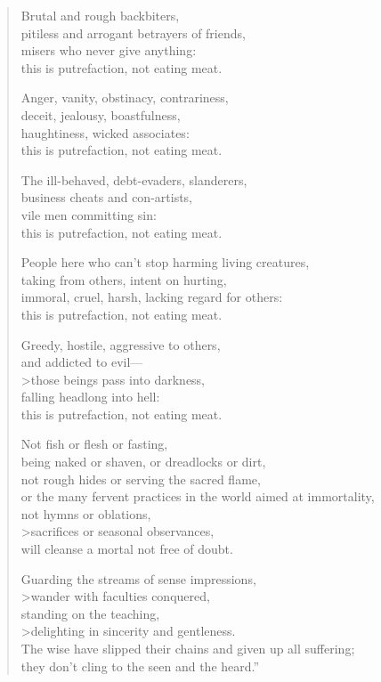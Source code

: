 \documentclass[12pt,openany]{book}%
\begin{document}
\begin{verse}
Brutal and rough backbiters, \\
pitiless and arrogant betrayers of friends, \\
misers who never give anything: \\
this is putrefaction, not eating meat. 

Anger, vanity, obstinacy, contrariness, \\
deceit, jealousy, boastfulness, \\
haughtiness, wicked associates: \\
this is putrefaction, not eating meat. 

The ill-behaved, debt-evaders, slanderers, \\
business cheats and con-artists, \\
vile men committing sin: \\
this is putrefaction, not eating meat. 

People here who can’t stop harming living creatures, \\
taking from others, intent on hurting, \\
immoral, cruel, harsh, lacking regard for others: \\
this is putrefaction, not eating meat. 

Greedy, hostile, aggressive to others, \\
and addicted to evil—\\>those beings pass into darkness, \\
falling headlong into hell: \\
this is putrefaction, not eating meat. 

Not fish or flesh or fasting, \\
being naked or shaven, or dreadlocks or dirt, \\
not rough hides or serving the sacred flame, \\
or the many fervent practices in the world aimed at immortality, \\
not hymns or oblations, \\>sacrifices or seasonal observances, \\
will cleanse a mortal not free of doubt. 

Guarding the streams of sense impressions, \\>wander with faculties conquered, \\
standing on the teaching, \\>delighting in sincerity and gentleness. \\
The wise have slipped their chains and given up all suffering; \\
they don’t cling to the seen and the heard.” 


\end{verse}
\end{document}
